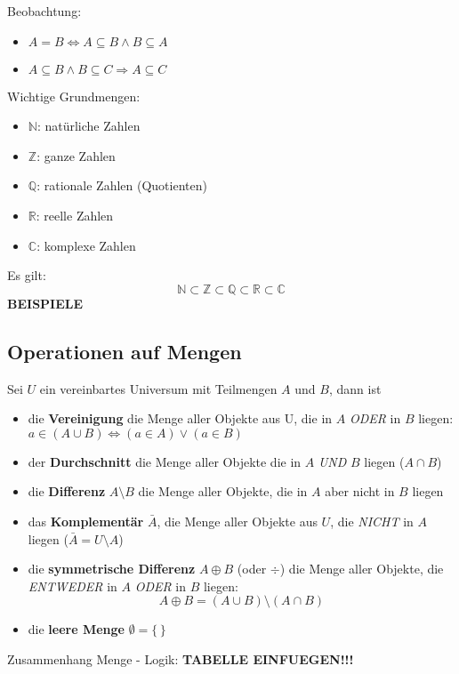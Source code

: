 Beobachtung:
\begin{itemize}
\item $A=B \Leftrightarrow A\subseteq B \land B\subseteq A$
\item $A\subseteq B \land B\subseteq C \Rightarrow A\subseteq C$
\end{itemize}

Wichtige Grundmengen:
\begin{itemize}
\item $\mathbb{N}$: natürliche Zahlen
\item $\mathbb{Z}$: ganze Zahlen
\item $\mathbb{Q}$: rationale Zahlen (Quotienten)
\item $\mathbb{R}$: reelle Zahlen
\item $\mathbb{C}$: komplexe Zahlen
\end{itemize}
Es gilt:
\[
\mathbb{N}\subset\mathbb{Z}\subset\mathbb{Q}\subset\mathbb{R}\subset\mathbb{C}
\]
\textbf{BEISPIELE}

\subsection{Operationen auf Mengen}
Sei $U$ ein vereinbartes Universum mit Teilmengen $A$ und $B$, dann ist
\begin{itemize}
\item die \textbf{Vereinigung} die Menge aller Objekte aus U, die in $A$ \emph{ODER} in $B$ liegen:\\
$a\in (A\cup B) \Leftrightarrow (a\in A) \lor (a\in B)$
\item der \textbf{Durchschnitt} die Menge aller Objekte die in $A$ \emph{UND} $B$ liegen ($A\cap B$)
\item die \textbf{Differenz} $A\setminus B$ die Menge aller Objekte, die in $A$ aber nicht in $B$ liegen
\item das \textbf{Komplementär} $\bar{A}$, die Menge aller Objekte aus $U$, die \emph{NICHT} in $A$ liegen ($\bar{A} = U\setminus A$)
\item die \textbf{symmetrische Differenz} $A\oplus B$ (oder $\div$) die Menge aller Objekte, die \emph{ENTWEDER} in $A$ \emph{ODER} in $B$ liegen:
\[
A\oplus B = (A\cup B)\setminus (A\cap B)
\]
\item die \textbf{leere Menge} $\emptyset = \{\,\}$
\end{itemize}

Zusammenhang Menge - Logik:
\textbf{TABELLE EINFUEGEN!!!}

